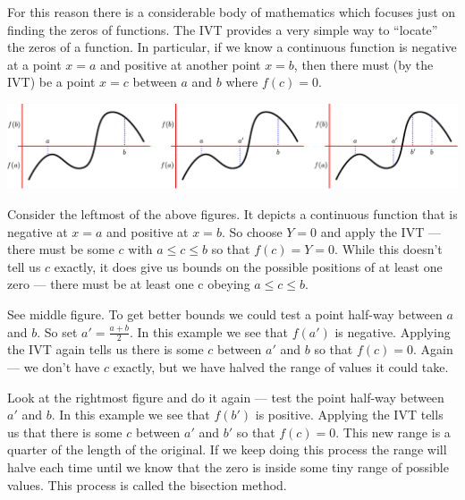 For this reason there is a considerable body of mathematics which focuses just
on finding the zeros of functions. The IVT provides a very simple way to
``locate'' the zeros of a function. In particular, if we know a continuous
function is  negative at a point $x=a$ and positive at another point $x=b$, then
there must (by the IVT) be a point $x=c$ between $a$ and $b$ where $f(c)=0$.
\begin{fig}
\begin{center}
 \includegraphics[width=\textwidth]{IVT3}
\end{center}
\end{fig}
Consider the leftmost of the above figures. It depicts a continuous function
that is negative at $x=a$ and positive at $x=b$. So choose $Y=0$ and apply the
IVT --- there must be some $c$ with $a \leq c \leq b$ so that $f(c) = Y = 0$.
While this doesn't tell us $c$ exactly, it does give us bounds on the possible positions
of at least one zero --- there must be at least one c obeying $a \le c \le b$.

See middle figure. To get better bounds we could test a point half-way between
$a$ and $b$. So set $a' = \frac{a+b}{2}$. In this example we see that $f(a')$
is
negative. Applying the IVT again tells us there is some $c$ between $a'$ and
$b$
so that $f(c) = 0$. Again --- we don't have $c$ exactly, but we have halved the
range of values it could take.

Look at the rightmost figure and do it again --- test the point half-way between
$a'$ and $b$. In this example we see that $f(b')$ is positive. Applying the IVT
tells us that there is some $c$ between $a'$ and $b'$ so that $f(c) = 0$. This
new range is a quarter of the length of the original. If we keep doing this
process the range will halve each time until we know that the zero is inside
some tiny range of possible values. This process is called the bisection method.

